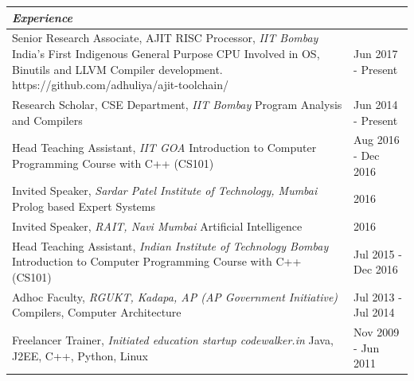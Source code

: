 \documentclass[a4paper,12pt]{article}
\newcommand{\Heading}[1]{\textbf{\itshape\normalsize #1}}
\begin{document}
\begin{flushleft}
    \vspace{3mm}
\begin{tabular}{ m{}| R{0.25\textwidth}}
\multicolumn{2}{l}{\Heading{Experience}} \\
    \hline
    \hline
    \rule[3ex]{0ex}{0ex}Senior Research Associate, AJIT RISC Processor, \textit{IIT Bombay} 
    \newline{}India's First Indigenous General Purpose CPU
    \newline{}Involved in OS, Binutils and LLVM Compiler development.
    \newline{}https://github.com/adhuliya/ajit-toolchain/
    & Jun 2017 - Present\\ \hline

    \rule[3ex]{0ex}{0ex}Research Scholar, CSE Department, \textit{IIT Bombay} \newline{}Program Analysis and Compilers & Jun 2014 - Present\\ \hline

    \rule[3ex]{0ex}{0ex}Head Teaching Assistant, \textit{IIT GOA} \newline{}Introduction to Computer Programming Course with C++ (CS101) & Aug 2016 - Dec 2016\\ \hline

    \rule[3ex]{0ex}{0ex}Invited Speaker, \textit{Sardar Patel Institute of Technology, Mumbai} \newline{}Prolog based Expert Systems & 2016\\ \hline

    \rule[3ex]{0ex}{0ex}Invited Speaker, \textit{RAIT, Navi Mumbai} \newline{}Artificial Intelligence & 2016\\ \hline

    \rule[3ex]{0ex}{0ex}Head Teaching Assistant, \textit{Indian Institute of Technology Bombay} \newline{}Introduction to Computer Programming Course with C++ (CS101) & Jul 2015 - Dec 2016\\ \hline

    \rule[3ex]{0ex}{0ex}Adhoc Faculty, \textit{RGUKT, Kadapa, AP (AP Government Initiative)} \newline{}Compilers, Computer Architecture& Jul 2013 - Jul 2014\\ \hline

    \rule[3ex]{0ex}{0ex}Freelancer Trainer, \textit{Initiated education startup codewalker.in} \newline{}Java, J2EE, C++, Python, Linux& Nov 2009 - Jun 2011\\ \hline 


\end{tabular}
\end{flushleft}
\end{document}

